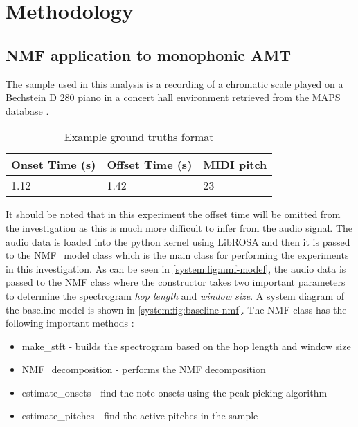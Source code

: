 \section{Methodology}

\subsection{NMF application to monophonic AMT}

The sample used in this analysis is a recording of a chromatic scale played on
a Bechstein D 280 piano in a concert hall environment retrieved from the MAPS database \cite{MAPS:Emiya}.

\begin{table}[!ht]
    \centering
    \begin{tabular}{|l|l|l|}
        \hline
        Onset Time  (s) & Offset Time (s) & MIDI pitch \\ \hline
        1.12            & 1.42            & 23         \\ \hline
    \end{tabular}
    \caption{Example ground truths format}
    \label{system:table:nmf-ground-truths}
\end{table}

It should be noted that in this experiment the offset time will be omitted from
the investigation as this is much more difficult to infer from the audio signal.
The audio data is loaded into the python kernel using LibROSA and then it is
passed to the \ac{NMF}\_model class which is the main class for performing the
experiments in this investigation. As can be seen in
\autoref{system:fig:nmf-model}, the audio data is passed to the \ac{NMF} class where
the constructor takes two important parameters to determine the spectrogram
\emph{hop length} and \emph{window size}. A system diagram of the baseline model is shown in \autoref{system:fig:baseline-nmf}.
The \ac{NMF} class has the following important methods :

\begin{itemize}
    \item make\_stft - builds the spectrogram based on the hop length and window size
    \item \ac{NMF}\_decomposition - performs the \ac{NMF} decomposition
    \item estimate\_onsets - find the note onsets using the peak picking algorithm
    \item estimate\_pitches - find the active pitches in the sample
\end{itemize}


